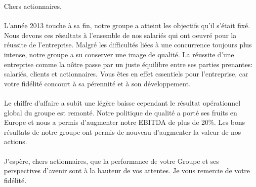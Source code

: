 Chers actionnaires,\\

\begin{minipage}[t]{0.42\textwidth}             
\paragraph{} L'année 2013 touche à sa fin, notre groupe a 
atteint les objectifs qu'il s'était fixé. Nous devons ces 
résultats à l'ensemble de nos salariés qui ont oeuvré pour 
la réussite de l'entreprise. Malgré les difficultés liées  
à une concurrence toujours plus intense, notre groupe a 
su conserver une image de qualité. La réussite d'une entreprise 
comme la nôtre passe par un juste équilibre entre ses parties
prenantes: salariés, clients et actionnaires. Vous êtes en 
effet essentiels pour l’entreprise, car votre fidélité 
concourt à sa pérennité et à son développement. 

\end{minipage}
\hspace*{0.1\textwidth}
\begin{minipage}[t]{0.42\textwidth}
\paragraph{} Le chiffre d'affaire a subit une légère baisse 
cependant le résultat opérationnel global du groupe est remonté.
Notre politique de qualité a porté ses fruits en Europe et nous 
a permis d'augmenter notre EBITDA de plus de 20\%. Les bons 
résultats de notre groupe ont permis de nouveau d'augmenter 
la valeur de nos actions.\\

\paragraph{} J’espère, chers actionnaires, que la performance 
de votre Groupe et ses perspectives d’avenir sont à la hauteur 
de vos attentes. Je vous remercie de votre fidélité.
\end{minipage}



